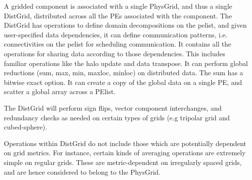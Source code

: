 A gridded component is associated with a single PhysGrid, and thus a
single DistGrid, distributed across all the PEs associated with the
component. The DistGrid has operations to define domain decompositions
on the pelist, and given user-specified data dependencies, it can
define communication patterns, i.e. connectivities on the pelist for
scheduling communication. It contains all the operations for sharing
data according to those dependencies. This includes familiar
operations like the halo update and data transpose. It can perform
global reductions (sum, max, min, maxloc, minloc) on distributed
data. The sum has a bitwise exact option. It can create a copy of the
global data on a single PE, and scatter a global array across a
PElist.

The DistGrid will perform sign flips, vector component interchanges,
and redundancy checks as needed on certain types of grids (e.g
tripolar grid and cubed-sphere).

Operations within DistGrid do not include those which are potentially
dependent on grid metrics. For instance, certain kinds of averaging
operations are extremely simple on regular grids. These are
metric-dependent on irregularly spaced grids, and are hence considered
to belong to the PhysGrid.

